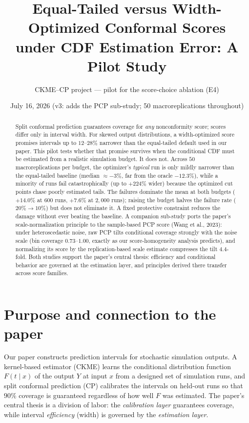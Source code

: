 \documentclass[11pt]{article}
\title{Equal-Tailed versus Width-Optimized Conformal Scores\\
under CDF Estimation Error: A Pilot Study}
\author{CKME--CP project --- pilot for the score-choice ablation (E4)}
\date{July 16, 2026 (v3: adds the PCP sub-study; 50 macroreplications throughout)}
\begin{document}
\maketitle

\begin{abstract}
\noindent
Split conformal prediction guarantees coverage for \emph{any} nonconformity
score; scores differ only in interval width. For skewed output distributions,
a width-optimized score promises intervals up to $12$--$28\%$ narrower than
the equal-tailed default used in our paper. This pilot tests whether that
promise survives when the conditional CDF must be estimated from a realistic
simulation budget. It does not. Across $50$ macroreplications per budget, the
optimizer's \emph{typical} run is only mildly narrower than the equal-tailed
baseline (median $\approx -3\%$, far from the oracle $-12.3\%$), while a
minority of runs fail catastrophically (up to $+224\%$ wider) because the
optimized cut points chase poorly estimated tails. The failures dominate the
mean at both budgets ($+14.0\%$ at $600$ runs, $+7.6\%$ at $2{,}000$ runs);
raising the budget halves the failure rate ($20\% \to 10\%$) but does not
eliminate it. A fixed protective constraint reduces the damage without ever
beating the baseline. A companion sub-study ports the paper's
scale-normalization principle to the sample-based PCP score (Wang et al.,
2023): under heteroscedastic noise, raw PCP tilts conditional coverage
strongly with the noise scale (bin coverage $0.73$--$1.00$, exactly as our
score-homogeneity analysis predicts), and normalizing its score by the
replication-based scale estimate compresses the tilt $4.4$-fold. Both
studies support the paper's central thesis: efficiency and conditional
behavior are governed at the estimation layer, and principles derived there
transfer across score families.
\end{abstract}

\section{Purpose and connection to the paper}

Our paper constructs prediction intervals for stochastic simulation outputs.
A kernel-based estimator (CKME) learns the conditional distribution function
$F(t \mid x)$ of the output $Y$ at input $x$ from a designed set of
simulation runs, and split conformal prediction (CP) calibrates the intervals
on held-out runs so that $90\%$ coverage is guaranteed regardless of how well
$F$ was estimated. The paper's central thesis is a division of labor: the
\emph{calibration layer} guarantees coverage, while interval
\emph{efficiency} (width) is governed by the \emph{estimation layer}.
\end{document}
